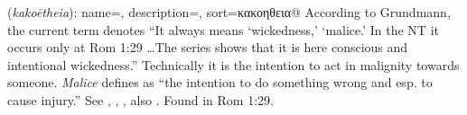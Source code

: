 \item[Malice,]

(\textit{kakoētheia}):
{
    name=,
    description={},
    sort=κακοηθεια@
}
According to Grundmann, the current term denotes ``It always means `wickedness,' `malice.' In the NT it occurs only at Rom 1:29 \ldots The series shows that it is here conscious and intentional wickedness.'' 
Technically it is the intention to act in malignity towards  someone. \emph{Malice} defines as ``the intention to do something wrong and esp. to cause injury.''
See , , , also .
Found in Rom 1:29.

